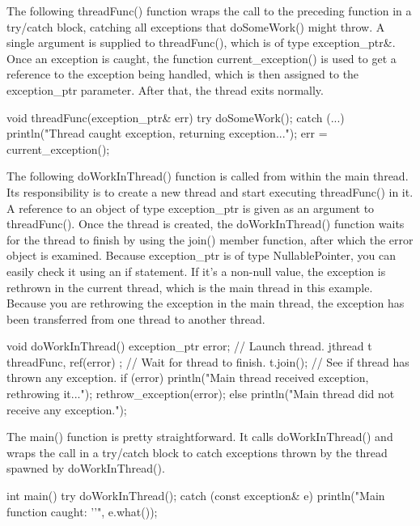The following threadFunc() function wraps the call to the preceding function in a try/catch block, catching all exceptions that doSomeWork() might throw. A single argument is supplied to threadFunc(), which is of type exception\_ptr\&. Once an exception is caught, the function current\_exception() is used to get a reference to the exception being handled, which is then assigned to the exception\_ptr parameter. After that, the thread exits normally.

\begin{cpp}
void threadFunc(exception_ptr& err)
{
    try {
        doSomeWork();
    } catch (...) {
        println("Thread caught exception, returning exception...");
        err = current_exception();
    }
}
\end{cpp}

The following doWorkInThread() function is called from within the main thread. Its responsibility is to create a new thread and start executing threadFunc() in it. A reference to an object of type exception\_ptr is given as an argument to threadFunc(). Once the thread is created, the doWorkInThread() function waits for the thread to finish by using the join() member function, after which the error object is examined. Because exception\_ptr is of type NullablePointer, you can easily check it using an if statement. If it’s a non-null value, the exception is rethrown in the current thread, which is the main thread in this example. Because you are rethrowing the exception in the main thread, the exception has been transferred from one thread to another thread.

\begin{cpp}
void doWorkInThread()
{
    exception_ptr error;
    // Launch thread.
    jthread t { threadFunc, ref(error) };
    // Wait for thread to finish.
    t.join();
    // See if thread has thrown any exception.
    if (error) {
        println("Main thread received exception, rethrowing it...");
        rethrow_exception(error);
    } else {
        println("Main thread did not receive any exception.");
    }
}
\end{cpp}

The main() function is pretty straightforward. It calls doWorkInThread() and wraps the call in a try/catch block to catch exceptions thrown by the thread spawned by doWorkInThread().

\begin{cpp}
int main()
{
    try {
        doWorkInThread();
    } catch (const exception& e) {
        println("Main function caught: '{}'", e.what());
    }
}
\end{cpp}

